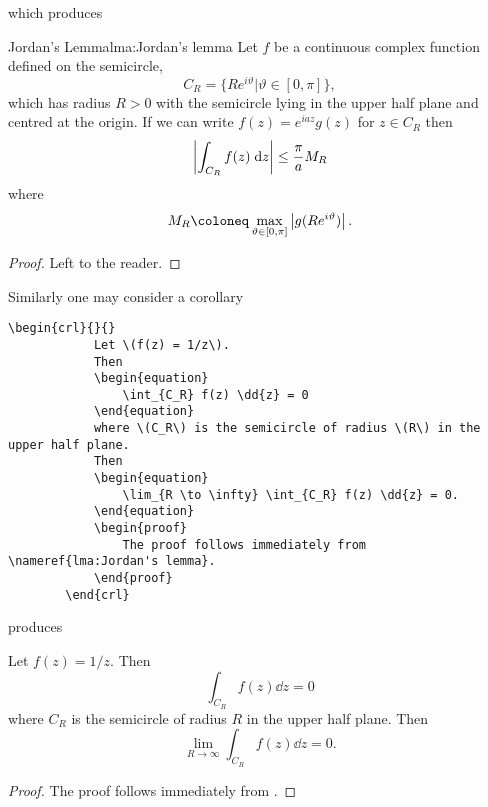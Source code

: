\documentclass[fleqn, a4paper, openany]{memoir}
\begin{document}
    which produces
    \begin{lma}{Jordan's Lemma}{lma:Jordan's lemma}
        Let \(f\) be a continuous complex function defined on the semicircle,
        \begin{equation}
            C_R = \{Re^{i\vartheta} \vert \vartheta \in [0, \pi]\},
        \end{equation}
        which has radius \(R > 0\) with the semicircle lying in the
        upper half plane and centred at the origin.
        If we can write \(f(z) = e^{iaz}g(z)\) for \(z\in C_R\) then
        \begin{equation}
            \abs{\int_{C_R} f(z) \dd{z}} \le \frac{\pi}{a}M_R
        \end{equation}
        where
        \begin{equation}
            M_R \coloneq \max_{\vartheta \in [0, \pi]}\abs{g(Re^{i\vartheta})}.
        \end{equation}
        \begin{proof}
            Left to the reader.
        \end{proof}
    \end{lma}
    Similarly one may consider a corollary
    \begin{Verbatim}[gobble=2]
        \begin{crl}{}{}
            Let \(f(z) = 1/z\).
            Then
            \begin{equation}
                \int_{C_R} f(z) \dd{z} = 0
            \end{equation}
            where \(C_R\) is the semicircle of radius \(R\) in the upper half plane.
            Then
            \begin{equation}
                \lim_{R \to \infty} \int_{C_R} f(z) \dd{z} = 0.
            \end{equation}
            \begin{proof}
                The proof follows immediately from \nameref{lma:Jordan's lemma}.
            \end{proof}
        \end{crl}
    \end{Verbatim}
    produces
    \begin{crl}{}{}
        Let \(f(z) = 1/z\).
        Then
        \begin{equation}
            \int_{C_R} f(z) \dd{z} = 0
        \end{equation}
        where \(C_R\) is the semicircle of radius \(R\) in the upper half plane.
        Then
        \begin{equation}
            \lim_{R \to \infty} \int_{C_R} f(z) \dd{z} = 0.
        \end{equation}
        \begin{proof}
            The proof follows immediately from .
        \end{proof}
    \end{crl}
    
\end{document}
